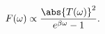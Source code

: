 \begin{equation} \label{hawking-formula}
F(\omega) \propto \frac{\abs{T(\omega)}^2}{e^{\beta \omega} - 1}.
\end{equation}

